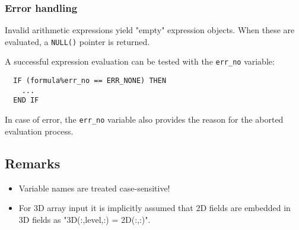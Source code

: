 \subsubsection{Error handling}

Invalid arithmetic expressions yield "empty" expression objects. When these
are evaluated, a \texttt{NULL()} pointer is returned.

A successful expression evaluation can be tested with the \texttt{err\_no} variable:
\begin{verbatim}
  IF (formula%err_no == ERR_NONE) THEN
    ...
  END IF
\end{verbatim}
In case of error, the \texttt{err\_no} variable also provides the
reason for the aborted evaluation process.


\subsection{Remarks}

\begin{itemize}
  \item Variable names are treated case-sensitive!
  \item For 3D array input it is implicitly assumed that 2D fields are
    embedded in 3D fields as "3D(:,level,:) = 2D(:,:)".
\end{itemize}




